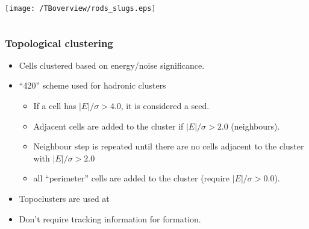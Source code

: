 \documentclass[10pt]{beamer}
\begin{document}
\begin{frame}
\begin{columns}
\texttt{[image: /TBoverview/rods\_slugs.eps]}\\
\end{columns}
\end{frame}
\begin{frame} 
\frametitle{Topological clustering}
\begin{itemize}
\item Cells clustered based on energy/noise significance.
\item ``420'' scheme used for hadronic clusters
\begin{itemize}
\item If a cell has $|E|/\sigma > 4.0$, it is considered a seed.
\item Adjacent cells are added to the cluster if $|E|/\sigma > 2.0$ (neighbours).
\item Neighbour step is repeated until there are no cells adjacent to the cluster with $|E|/\sigma > 2.0$
\item all ``perimeter'' cells are added to the cluster (require $|E|/\sigma > 0.0$).
\end{itemize}
\item Topoclusters are used at \atlas
\item Don't require tracking information for formation.
\end{itemize}
 

\end{frame}
\end{document}
